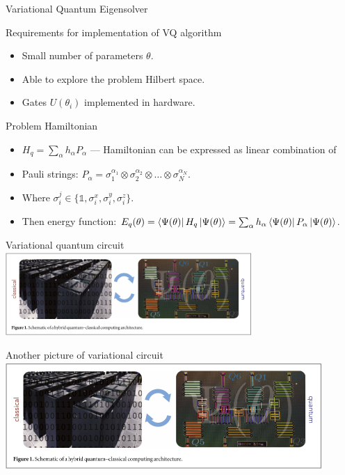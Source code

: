 \begin{frame}{Variational Quantum Eigensolver}
    \begin{block}{Requirements for implementation of VQ algorithm}
        \begin{itemize}
            \item Small number of parameters $\theta$.
            \item Able to explore the problem Hilbert space.
            \item Gates $U(\theta_i)$ implemented in hardware.
        \end{itemize}
    \end{block}
    \begin{block}{Problem Hamiltonian}
    \begin{itemize}
        \item $H_q = \sum_\alpha h_\alpha P_\alpha$ --- Hamiltonian can be expressed as linear combination of 
        \item Pauli strings: $P_\alpha = \sigma_1^{\alpha_1}\otimes\sigma_2^{\alpha_2}\otimes \ldots\otimes\sigma_N^{\alpha_N}$.
        \item Where $\sigma_i^j \in \{\mathbb{1}, \sigma_i^x, \sigma_i^y, \sigma_i^z\}$.
        \item Then energy function: $E_q(\theta) = \bra{\Psi(\theta)}H_q\ket{\Psi(\theta)} = \sum_\alpha h_\alpha \bra{\Psi(\theta)}P_\alpha\ket{\Psi(\theta)}$.
    \end{itemize}
    \end{block}
\end{frame}
\endgroup
\begingroup
\nologo
\begin{frame}{Variational quantum circuit}
    \centering
    \includegraphics[page=2, width=0.7\textwidth]{pics/vqe.pdf}
\end{frame}
\begin{frame}{Another picture of variational circuit}
    \centering
    \includegraphics[page=3, width=0.9\textwidth]{pics/vqe.pdf}
\end{frame}
